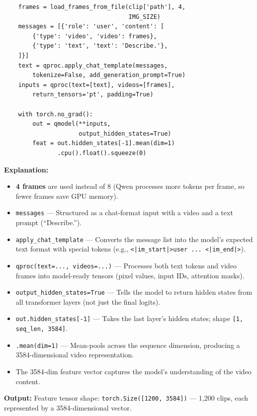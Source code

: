 \documentclass[a4paper, 12pt]{article}
\newenvironment{explanation}{%
  \par\smallskip
  \noindent\textcolor{blue!70!black}{\textbf{Explanation:}}\\
  \noindent
}{\par\medskip}
\begin{document}
\begin{lstlisting}
    frames = load_frames_from_file(clip['path'], 4,
                                   IMG_SIZE)
    messages = [{'role': 'user', 'content': [
        {'type': 'video', 'video': frames},
        {'type': 'text', 'text': 'Describe.'},
    ]}]
    text = qproc.apply_chat_template(messages,
        tokenize=False, add_generation_prompt=True)
    inputs = qproc(text=[text], videos=[frames],
        return_tensors='pt', padding=True)

    with torch.no_grad():
        out = qmodel(**inputs,
                     output_hidden_states=True)
        feat = out.hidden_states[-1].mean(dim=1)
               .cpu().float().squeeze(0)
\end{lstlisting}

\begin{explanation}
\begin{itemize}[nosep]
  \item \textbf{4 frames} are used instead of 8 (Qwen processes more tokens per frame, so fewer frames save GPU memory).
  \item \texttt{messages} --- Structured as a chat-format input with a video and a text prompt (``Describe.'').
  \item \texttt{apply\_chat\_template} --- Converts the message list into the model's expected text format with special tokens (e.g., \texttt{<|im\_start|>user ... <|im\_end|>}).
  \item \texttt{qproc(text=..., videos=...)} --- Processes both text tokens and video frames into model-ready tensors (pixel values, input IDs, attention masks).
  \item \texttt{output\_hidden\_states=True} --- Tells the model to return hidden states from all transformer layers (not just the final logits).
  \item \texttt{out.hidden\_states[-1]} --- Takes the last layer's hidden states; shape \texttt{[1, seq\_len, 3584]}.
  \item \texttt{.mean(dim=1)} --- Mean-pools across the sequence dimension, producing a 3584-dimensional video representation.
  \item The 3584-dim feature vector captures the model's understanding of the video content.
\end{itemize}
\end{explanation}

\textbf{Output:} Feature tensor shape: \texttt{torch.Size([1200, 3584])} --- 1,200 clips, each represented by a 3584-dimensional vector.
\end{document}

